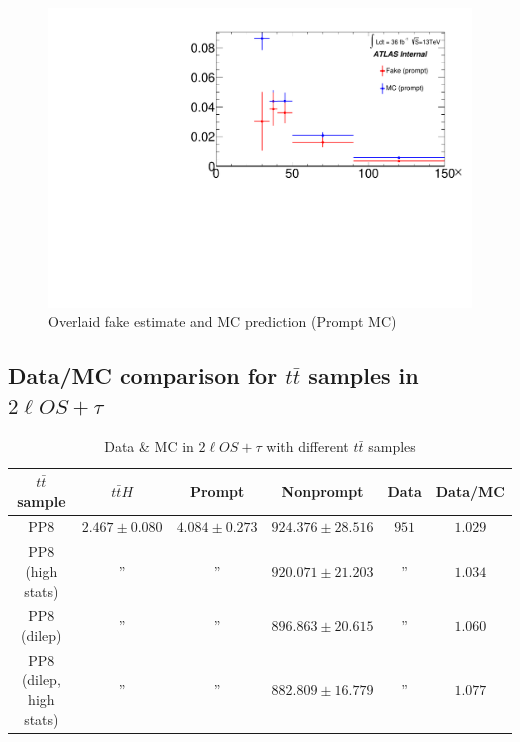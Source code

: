 \documentclass[11pt]{article}
\begin{document}
	\begin{figure}[H]
		\centering
		\includegraphics[width=0.7\linewidth]{figures/FakesEstimate_data_pp8_nonallhad_new_scaledHists/Overlay_FF_tau_pt_prompt.pdf}
		\caption{Overlaid fake estimate and MC prediction (Prompt MC)}
	\end{figure}	



	
	\clearpage
	\subsection{Data/MC comparison for $t\bar{t}$ samples in $2\ell OS+\tau$} 
	
	\begin{table}[htp]
	\caption{Data \& MC in $2\ell OS+\tau$ with different $t\bar{t}$ samples}
	\begin{center}
	\begin{tabular}{|c|c|c|c|c|c|}
	\hline
	$t\bar{t}$ sample 	& $t\bar{t}H$	& Prompt		& Nonprompt		& 	 Data 	& Data/MC\\
	\hline
	PP8 				& 	$2.467 \pm 0.080$ 		& $4.084 \pm 0.273$ 		& $924.376 \pm 28.516$	&  $951$ 	& $1.029$\\
	PP8 (high stats)		& 			''	 		&			''			& $920.071 \pm 21.203$	&  	''	& $1.034$\\
	PP8 (dilep) 			& 			''	 		& 			''			& $896.863 \pm 20.615$	&   	''	& $1.060$\\
	PP8 (dilep, high stats)	& 			''			& 			''	 		& $882.809 \pm 16.779$	&   	''	& $1.077$\\ 
	\hline
	\end{tabular}
	\end{center}
	\label{default}
	\end{table}%
\end{document}
